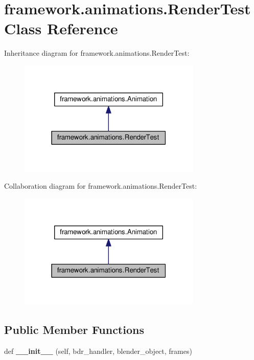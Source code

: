 \hypertarget{classframework_1_1animations_1_1RenderTest}{}\section{framework.\+animations.\+Render\+Test Class Reference}
\label{classframework_1_1animations_1_1RenderTest}


Inheritance diagram for framework.\+animations.\+Render\+Test\+:
\nopagebreak
\begin{figure}[H]
\begin{center}
\leavevmode
\includegraphics[width=247pt]{classframework_1_1animations_1_1RenderTest__inherit__graph}
\end{center}
\end{figure}


Collaboration diagram for framework.\+animations.\+Render\+Test\+:
\nopagebreak
\begin{figure}[H]
\begin{center}
\leavevmode
\includegraphics[width=247pt]{classframework_1_1animations_1_1RenderTest__coll__graph}
\end{center}
\end{figure}
\subsection*{Public Member Functions}
\begin{DoxyCompactItemize}
\item 
def {\bfseries \+\_\+\+\_\+init\+\_\+\+\_\+} (self, bdr\+\_\+handler, blender\+\_\+object, frames)\hypertarget{classframework_1_1animations_1_1RenderTest_aa88a2318c3c4e47be17feb86c3a94514}{}\label{classframework_1_1animations_1_1RenderTest_aa88a2318c3c4e47be17feb86c3a94514}

\end{DoxyCompactItemize}
